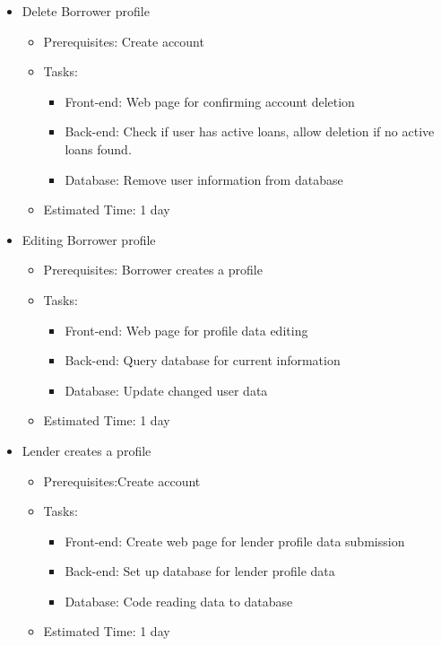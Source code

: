 \begin{itemize}
	\item Delete Borrower profile
	\begin{itemize}
		\item Prerequisites: Create account
		\item Tasks:
		\begin{itemize}
			\item Front-end: Web page for confirming account deletion
			\item Back-end: Check if user has active loans, allow deletion if no active loans found.
			\item Database: Remove user information from database
		\end{itemize}
		\item Estimated Time: 1 day
	\end{itemize}

	\item Editing Borrower profile
	\begin{itemize}
		\item Prerequisites: Borrower creates a profile
		\item Tasks:
		\begin{itemize}
			\item Front-end: Web page for profile data editing
			\item Back-end: Query database for current information
			\item Database: Update changed user data
		\end{itemize}
		\item Estimated Time: 1 day
	\end{itemize}

	\item Lender creates a profile
	\begin{itemize}
		\item Prerequisites:Create account
		\item Tasks:
		\begin{itemize}
			\item Front-end: Create web page for lender profile data submission
			\item Back-end: Set up database for lender profile data
			\item Database: Code reading data to database
		\end{itemize}
		\item Estimated Time: 1 day
	\end{itemize}


\end{itemize}
